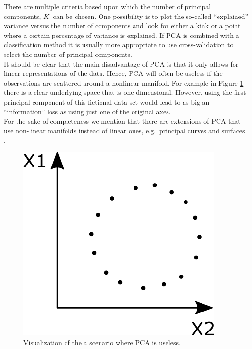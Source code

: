There are multiple criteria based upon which the number of principal components, $K$, can be chosen. One possibility is to plot the so-called ``explained'' variance versus the number of components and look for either a kink or a point where a certain percentage of variance is explained. If PCA is combined with a classification method it is usually more appropriate to use cross-validation to select the number of principal components. \\

It should be clear that the main disadvantage of PCA is that it only allows for linear representations of the data. Hence, PCA will often be useless if the observations are scattered around a nonlinear manifold. For example in Figure \ref{fig:PCACircle} there is a clear underlying space that is one dimensional. However, using the first principal component of this fictional data-set would lead to as big an ``information'' loss as using just one of the original axes. \\

For the sake of completeness we mention that there are extensions of PCA that use non-linear manifolds instead of linear ones, e.g.\ principal curves and surfaces \parencite{hastie_principal_1989}. \\

\begin{figure}[!htb]
\centering
\includegraphics[scale=0.5]{VectorGraphics/PCACircle.png}
\caption{\label{fig:PCACircle}Visualization of the a scenario where PCA is useless.}
\end{figure}



